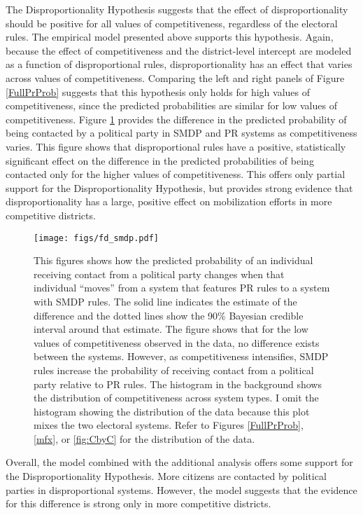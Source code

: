 \documentclass[12pt]{article}
\begin{document}
The Disproportionality Hypothesis suggests that the effect of disproportionality should be positive for all values of competitiveness, regardless of the electoral rules. The empirical model presented above supports this hypothesis. Again, because the effect of competitiveness and the district-level intercept are modeled as a function of disproportional rules, disproportionality has an effect that varies across values of competitiveness. Comparing the left and right panels of Figure \ref{FullPrProb} suggests that this hypothesis only holds for high values of competitiveness, since the predicted probabilities are similar for low values of competitiveness. Figure \ref{FD} provides the difference in the predicted probability of being contacted by a political party in SMDP and PR systems as competitiveness varies. This figure shows that disproportional rules have a positive, statistically significant effect on the difference in the predicted probabilities of being contacted only for the higher values of competitiveness. This offers only partial support for the Disproportionality Hypothesis, but provides strong evidence that disproportionality has a large, positive effect on mobilization efforts in more competitive districts.

\begin{figure}[h]
\centering
\texttt{[image: figs/fd\_smdp.pdf]}
\caption{This figures shows how the predicted probability of an individual receiving contact from a political party changes when that individual ``moves'' from a system that features PR rules to a system with SMDP rules. The solid line indicates the estimate of the difference and the dotted lines show the 90\% Bayesian credible interval around that estimate. The figure shows that for the low values of competitiveness observed in the data, no difference exists between the systems. However, as competitiveness intensifies, SMDP rules increase the probability of receiving contact from a political party relative to PR rules. The histogram in the background shows the distribution of competitiveness across system types. I omit the histogram showing the distribution of the data because this plot mixes the two electoral systems. Refer to Figures \ref{FullPrProb}, \ref{mfx}, or \ref{fig:CbyC} for the distribution of the data.}\label{FD}
\end{figure}

Overall, the model combined with the additional analysis offers some support for the Disproportionality Hypothesis. More citizens are contacted by political parties in disproportional systems. However, the model suggests that the evidence for this difference is strong only in more competitive districts.
\end{document}
